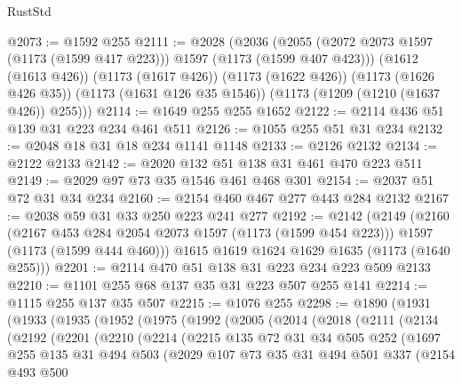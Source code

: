 \begin{lexlean}{RustStd}
\begin{coremodule}
@2073 := @1592 @255
@2111 := @2028
    (@2036
      (@2055 (@2072 @2073 @1597 (@1173 (@1599 @417 @223))) @1597 (@1173 (@1599 @407 @423)))
      (@1612 (@1613 @426))
      (@1173 (@1617 @426))
      (@1173 (@1622 @426))
      (@1173 (@1626 @426 @35))
      (@1173 (@1631 @126 @35 @1546))
      (@1173 (@1209 (@1210 (@1637 @426)) @255)))
@2114 := @1649 @255 @255 @1652
@2122 := @2114 @436 @51 @139 @31 @223 @234 @461 @511
@2126 := @1055 @255 @51 @31 @234
@2132 := @2048 @18 @31 @18 @234 @1141 @1148
@2133 := @2126 @2132
@2134 := @2122 @2133
@2142 := @2020 @132 @51 @138 @31 @461 @470 @223 @511
@2149 := @2029 @97 @73 @35 @1546 @461 @468 @301
@2154 := @2037 @51 @72 @31 @34 @234
@2160 := @2154 @460 @467 @277 @443 @284 @2132
@2167 := @2038 @59 @31 @33 @250 @223 @241 @277
@2192 := @2142
    (@2149
      (@2160
        (@2167 @453 @284 @2054 @2073 @1597 (@1173 (@1599 @454 @223)))
        @1597
        (@1173 (@1599 @444 @460)))
      @1615
      @1619
      @1624
      @1629
      @1635
      (@1173 (@1640 @255)))
@2201 := @2114 @470 @51 @138 @31 @223 @234 @223 @509 @2133
@2210 := @1101 @255 @68 @137 @35 @31 @223 @507 @255 @141
@2214 := @1115 @255 @137 @35 @507
@2215 := @1076 @255
@2298 := @1890
    (@1931
      (@1933
        (@1935
          (@1952
            (@1975
              (@1992
                (@2005
                  (@2014
                    (@2018
                      (@2111
                        (@2134
                          (@2192
                            (@2201
                              (@2210
                                (@2214
                                  (@2215
                                    @135
                                    @72
                                    @31
                                    @34
                                    @505
                                    @252
                                    (@1697
                                      @255
                                      @135
                                      @31
                                      @494
                                      @503
                                      (@2029
                                        @107
                                        @73
                                        @35
                                        @31
                                        @494
                                        @501
                                        @337
                                        (@2154
                                          @493
                                          @500

\end{coremodule}
\end{lexlean}
